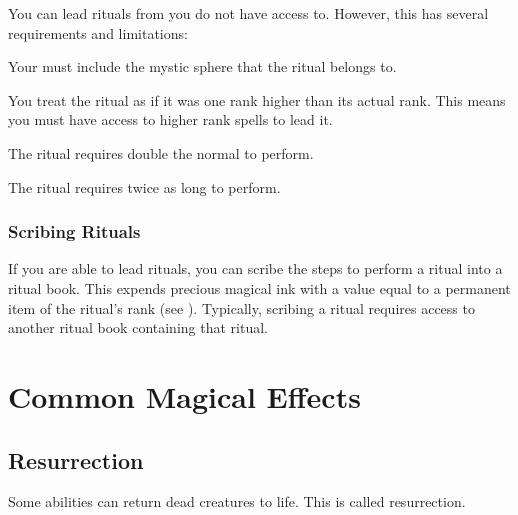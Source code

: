       You can lead rituals from  you do not have access to.
      However, this has several requirements and limitations:

    \begin{raggeditemize}
      \item Your  must include the mystic sphere that the ritual belongs to.
      \item You treat the ritual as if it was one rank higher than its actual rank.
        This means you must have access to higher rank spells to lead it.
      \item The ritual requires double the normal  to perform.
      \item The ritual requires twice as long to perform.
    \end{raggeditemize}

    \subsubsection{Scribing Rituals}
      If you are able to lead rituals, you can scribe the steps to perform a ritual into a ritual book.
      This expends precious magical ink with a value equal to a permanent item of the ritual's rank (see ).
      Typically, scribing a ritual requires access to another ritual book containing that ritual.


\section{Common Magical Effects}

  \subsection{Resurrection}\label{Resurrection}
    Some abilities can return dead creatures to life.
    This is called resurrection.


